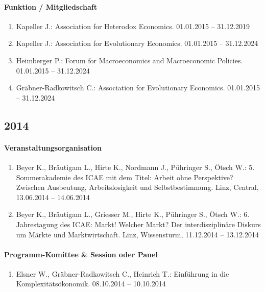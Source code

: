 \paragraph{Funktion / Mitgliedschaft}
\begin{enumerate}[leftmargin=*, labelsep=0.5cm]
\item Kapeller J.: Association for Heterodox Economics. 01.01.2015 -- 31.12.2019
\item Kapeller J.: Association for Evolutionary Economics. 01.01.2015 -- 31.12.2024
\item Heimberger P.: Forum for Macroeconomics and Macroeconomic Policies. 01.01.2015 -- 31.12.2024
\item Gräbner-Radkowitsch C.: Association for Evolutionary Economics. 01.01.2015 -- 31.12.2024
\end{enumerate}
\subsection*{2014}
\paragraph{Veranstaltungsorganisation}
\begin{enumerate}[leftmargin=*, labelsep=0.5cm]
\item Beyer K., Bräutigam L., Hirte K., Nordmann J., Pühringer S., Ötsch W.: 5. Sommerakademie des ICAE mit dem Titel: Arbeit ohne Perspektive? Zwischen Ausbeutung, Arbeitslosigkeit und Selbstbestimmung. Linz, Central, 13.06.2014 -- 14.06.2014
\item Beyer K., Bräutigam L., Griesser M., Hirte K., Pühringer S., Ötsch W.: 6. Jahrestagung des ICAE: Markt! Welcher Markt? Der interdisziplinäre Diskurs um Märkte und Marktwirtschaft. Linz, Wissensturm, 11.12.2014 -- 13.12.2014
\end{enumerate}

\paragraph{Programm-Komittee \& Session oder Panel}
\begin{enumerate}[leftmargin=*, labelsep=0.5cm]
\item Elsner W., Gräbner-Radkowitsch C., Heinrich T.: Einführung in die Komplexitätsökonomik. 08.10.2014 -- 10.10.2014
\end{enumerate}

